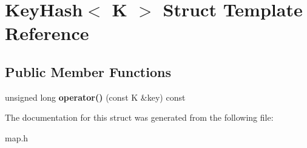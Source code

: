 \hypertarget{struct_key_hash}{}\section{Key\+Hash$<$ K $>$ Struct Template Reference}
\label{struct_key_hash}
\subsection*{Public Member Functions}
\begin{DoxyCompactItemize}
\item 
\mbox{\label{struct_key_hash_a35aecf817e0734515ca84ec397465a58}} 
unsigned long {\bfseries operator()} (const K \&key) const
\end{DoxyCompactItemize}


The documentation for this struct was generated from the following file\+:\begin{DoxyCompactItemize}
\item 
map.\+h\end{DoxyCompactItemize}
